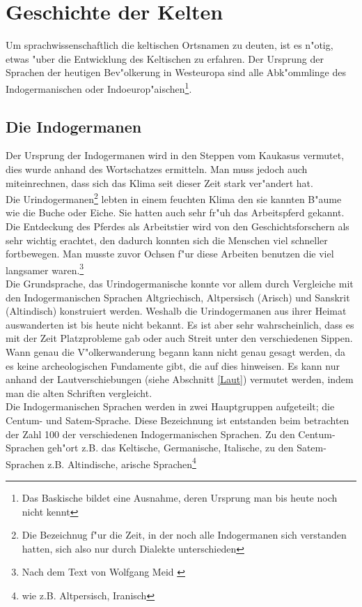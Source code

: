 \documentclass[10pt]{article}
\begin{document}
\section{Geschichte der Kelten}
Um sprachwissenschaftlich die keltischen Ortsnamen zu deuten, ist es n"otig,
etwas "uber die Entwicklung des Keltischen zu erfahren. Der Ursprung der 
Sprachen der heutigen Bev"olkerung in Westeuropa sind alle Abk"ommlinge des
Indogermanischen oder Indoeurop"aischen\footnote{Das Baskische bildet eine
Ausnahme, deren Ursprung man bis heute noch nicht kennt}.

\subsection{Die Indogermanen}
Der Ursprung der Indogermanen wird in den Steppen vom Kaukasus vermutet, dies
wurde anhand des Wortschatzes ermitteln. Man muss jedoch
auch miteinrechnen, dass sich das Klima seit dieser Zeit stark ver"andert hat.\\
Die Urindogermanen\footnote{Die Bezeichnug f"ur die Zeit, in der noch alle
Indogermanen sich verstanden hatten, sich also nur durch Dialekte
unterschieden} lebten in einem feuchten Klima den sie kannten B"aume wie
die Buche oder Eiche. Sie hatten auch sehr fr"uh das Arbeitspferd gekannt.
Die Entdeckung des Pferdes als Arbeitstier wird von den Geschichtsforschern
als sehr wichtig erachtet, den dadurch konnten sich die Menschen viel schneller
fortbewegen. Man musste zuvor Ochsen f"ur diese Arbeiten benutzen die 
viel langsamer waren.\footnote{Nach dem Text von Wolfgang Meid \cite{IDG:MEID}}\\
Die Grundsprache, das Urindogermanische konnte vor allem durch Vergleiche
mit den Indogermanischen Sprachen Altgriechisch, Altpersisch (Arisch) und
Sanskrit (Altindisch) konstruiert werden. Weshalb die Urindogermanen
aus ihrer Heimat auswanderten ist bis heute nicht bekannt. Es ist aber sehr
wahrscheinlich, dass es mit der Zeit Platzprobleme gab oder auch Streit
unter den verschiedenen Sippen. Wann genau die V"olkerwanderung begann kann
nicht genau gesagt werden, da es keine archeologischen Fundamente gibt, die
auf dies hinweisen. Es kann nur anhand der Lautverschiebungen (siehe Abschnitt
\ref{Laut}) vermutet werden,
indem man die alten Schriften vergleicht.\\
Die Indogermanischen Sprachen werden in zwei Hauptgruppen aufgeteilt; die Centum-
und Satem-Sprache.
Diese Bezeichnung ist entstanden beim betrachten der Zahl 100 der verschiedenen
Indogermanischen Sprachen. Zu den Centum-Sprachen geh"ort z.B. das Keltische, 
Germanische, Italische, zu den Satem-Sprachen z.B. Altindische, arische
Sprachen\footnote{wie z.B. Altpersisch, Iranisch}
\end{document}
